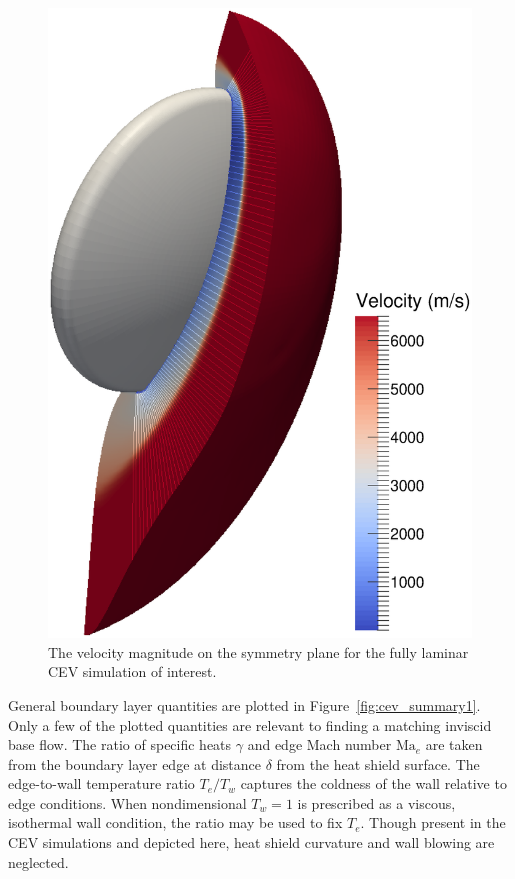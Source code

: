 \documentclass[letterpaper,11pt,nointlimits,reqno]{amsart}
\newcommand{\Mach}[1][]{\mbox{Ma}_{#1}}
\begin{document}
\begin{figure}
  \centering
  \includegraphics[height=0.60\textheight]{symplanenorm}
  \caption{
    \label{fig:cev_symplane}
    The velocity magnitude on the symmetry plane for the fully laminar
    CEV simulation of interest.
  }
\end{figure}

General boundary layer quantities are plotted in Figure~\ref{fig:cev_summary1}.
Only a few of the plotted quantities are relevant to finding a matching
inviscid base flow.  The ratio of specific heats $\gamma$ and edge Mach number
$\Mach[e]{}$ are taken from the boundary layer edge at distance $\delta$ from
the heat shield surface. The edge-to-wall temperature ratio $T_e/T_w$ captures
the coldness of the wall relative to edge conditions.   When nondimensional
$T_w = 1$ is prescribed as a viscous, isothermal wall condition, the ratio may
be used to fix $T_e$. Though present in the CEV simulations and depicted here,
heat shield curvature and wall blowing are neglected.
\end{document}
